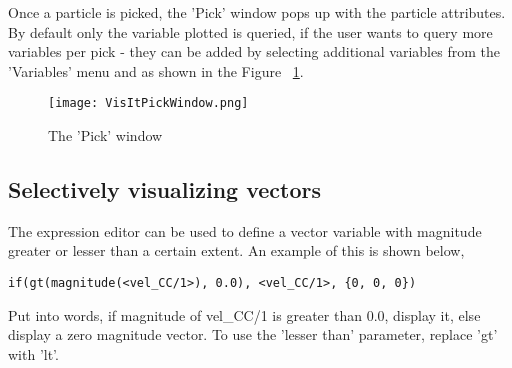 Once a particle is picked, the 'Pick' window pops up with the particle
attributes. By default only the variable plotted is queried, if the
user wants to query more variables per pick - they can be added by
selecting additional variables from the 'Variables' menu and as shown
in the Figure ~\ref{VisItPickWindow}.



\begin{figure}[h]
  \centering
  \texttt{[image: VisItPickWindow.png]}
  \caption{The 'Pick' window}
  \label{VisItPickWindow}
\end{figure}

\subsection{Selectively visualizing vectors}
The expression editor can be used to define a vector variable with magnitude greater or lesser than a certain extent. An example of this is shown below,

\begin{verbatim}
if(gt(magnitude(<vel_CC/1>), 0.0), <vel_CC/1>, {0, 0, 0})
\end{verbatim}

Put into words, if magnitude of vel\_CC/1 is greater than 0.0, display it, else display a zero magnitude vector. To use the 'lesser than' parameter, replace 'gt' with 'lt'.


